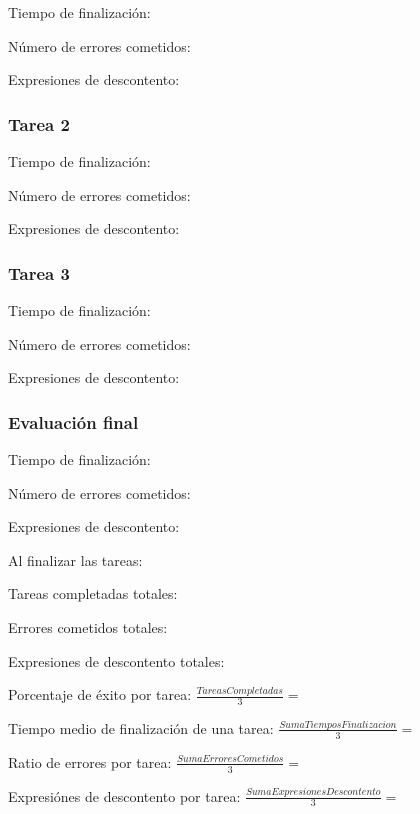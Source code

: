 \documentclass[spanish]{article}
\begin{document}
Tiempo de finalización:

Número de errores cometidos:

Expresiones de descontento:

\subsubsection{Tarea 2}

Tiempo de finalización:

Número de errores cometidos:

Expresiones de descontento:

\subsubsection{Tarea 3}

Tiempo de finalización:

Número de errores cometidos:

Expresiones de descontento:

\subsubsection{Evaluación final}

Tiempo de finalización:

Número de errores cometidos:

Expresiones de descontento:

Al finalizar las tareas:

Tareas completadas totales: 

Errores cometidos totales:

Expresiones de descontento totales:\newline

Porcentaje de éxito por tarea:
\(\frac{TareasCompletadas}{3} = \)\newline

Tiempo medio de finalización de una tarea:
\(\frac{SumaTiemposFinalizacion}{3} = \)\newline

Ratio de errores por tarea:
\(\frac{SumaErroresCometidos}{3} = \)\newline

Expresiónes de descontento por tarea:
\(\frac{SumaExpresionesDescontento}{3} = \)\newline

\newpage
\end{document}
